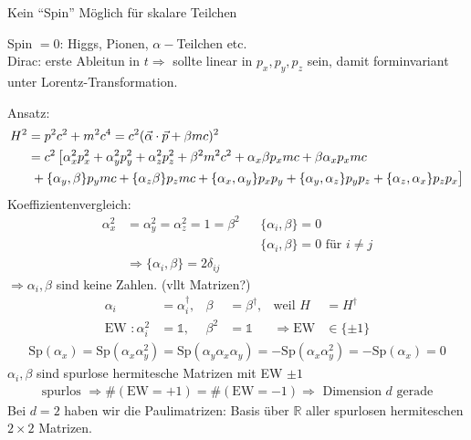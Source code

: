 Kein ``Spin'' Möglich für skalare Teilchen

Spin $=0$: Higgs, Pionen, $\alpha-$Teilchen etc.
\\
Dirac: erste Ableitun in $t \Rightarrow$ sollte linear in $p_x, p_y, p_z$ sein, damit forminvariant unter Lorentz-Transformation.

Ansatz:
	\begin{align*}
		H^2 &= p^2 c^2 + m^2 c^4 = c^2 (\vec{\alpha} \cdot \vec{p} + \beta m c)^2\\
		&= c^2 
		\left[
			\alpha_x^2 p_x^2 + \alpha_y^2 p_y^2 +\alpha_z^2 p_z^2
			+ \beta^2m^2c^2 + \alpha_x \beta p_x m c + \beta \alpha_x p_x mc \right.\\
			&\left.\vphantom{\alpha_x^2 p_x^2} + \{\alpha_y, \beta\} p_y mc + \{\alpha_z \beta \} p_z mc 
			+ \{\alpha_x, \alpha_y\} p_x p_y + \{\alpha_y, \alpha_z\} p_y p_z
			+\{\alpha_z, \alpha_x\}p_z p_x
 		\right]
	\end{align*}
Koeffizientenvergleich:
	\begin{align*}
		\alpha_x^2 &= \alpha_y^2 = \alpha_z^2 = 1 = \beta^2
		& &\boxed{\{\alpha_i, \beta \} = 0}\\
		& & &\{\alpha_i, \beta \} = 0 \text{ für } i \neq j \\
		&\Rightarrow \boxed{\{\alpha_i, \beta \} = 2 \delta_{ij}}
	\end{align*}
$\Rightarrow \alpha_i, \beta$ sind keine Zahlen. (vllt Matrizen?)
	\begin{align*}
		\alpha_i &= \alpha_i^\dagger ,&
		\beta &= \beta^\dagger ,& 
		\text{weil } H &= H^\dagger \\
		\text{EW }: \alpha_i^2 &= \mathds{1} ,&
		\beta^2 &= \mathds{1} 
		&\Rightarrow \mathrm{ EW } &\in \{\pm 1\}  
	\end{align*}
	\begin{align*}
		\mathrm{Sp}(\alpha_x) = \mathrm{Sp}(\alpha_x\alpha_y^2) 
		= \mathrm{Sp} (\alpha_y \alpha_x \alpha_y) 
		= - \mathrm{Sp}(\alpha_x \alpha_y^2) = -\mathrm{Sp}(\alpha_x) = 0
	\end{align*}
$\alpha_i, \beta$ sind spurlose hermitesche Matrizen mit EW $\pm 1$
	\begin{align*}
		\text{spurlos } \Rightarrow \# (\mathrm{EW } = + 1)
		= \# (\mathrm{EW } = - 1) \Rightarrow \text{ Dimension }d\text{ gerade}
	\end{align*}
Bei $d=2$ haben wir die Paulimatrizen: Basis über $\mathds{R}$ aller spurlosen hermiteschen $2 \times 2$ Matrizen.

